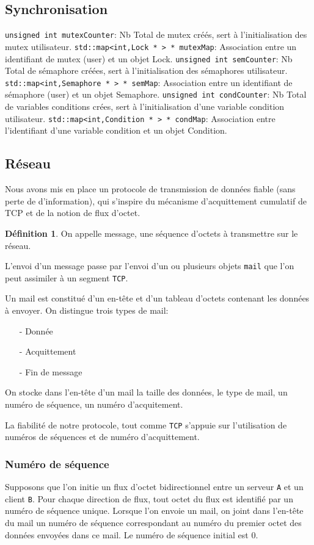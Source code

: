 \documentclass[11pt]{article}
\theoremstyle{definition}
\theoremstyle{definition}
\newtheorem*{myDef}{Définition}
\begin{document}
\subsection{Synchronisation}
\texttt{unsigned int mutexCounter}: Nb Total de mutex créés, sert à l'initialisation des mutex utilisateur.
\texttt{std::map<int,Lock * > * mutexMap}: Association entre un identifiant de mutex (user) et un objet Lock.
\texttt{unsigned int semCounter}: Nb Total de sémaphore créées, sert à l'initialisation des sémaphores utilisateur.
\texttt{std::map<int,Semaphore * > * semMap}: Association entre un identifiant de sémaphore (user) et un objet Semaphore.
\texttt{unsigned int condCounter}: Nb Total de variables conditions crées, sert à l'initialisation d'une variable
condition utilisateur.
\texttt{std::map<int,Condition * > * condMap}: Association entre l'identifiant d'une variable condition et
un objet Condition.

\subsection{Réseau}
Nous avons mis en place un protocole de transmission de données fiable (sans perte de d'information), qui s'inspire du mécanisme d'acquittement cumulatif de TCP et de la notion de flux d'octet.
\begin{myDef}
  On appelle message, une séquence d'octets à transmettre sur le réseau.
\end{myDef}
L'envoi d'un message passe par l'envoi d'un ou plusieurs objets \texttt{mail} que l'on peut assimiler à un segment \texttt{TCP}. 

Un mail est constitué d'un en-tête et d'un tableau d'octets contenant les données à envoyer.
On distingue trois types de mail:
\begin{itemize}
\item[-]Donnée
\item[-]Acquittement
\item[-]Fin de message
\end{itemize}

On stocke dans l'en-tête d'un mail la taille des données, le type de mail, un numéro de séquence, un
numéro d'acquitement.

La fiabilité de notre protocole, tout comme \texttt{TCP} s'appuie sur l'utilisation de numéros de séquences
et de numéro d'acquittement.

\subsubsection{Numéro de séquence}
Supposons que l'on initie un flux d'octet bidirectionnel entre un serveur \texttt{A} et un client \texttt{B}.
Pour chaque direction de flux, tout octet du flux est identifié par un numéro de séquence unique. 
Lorsque l'on envoie un mail, on joint dans l'en-tête du mail un numéro de séquence correspondant
au numéro du premier octet des données envoyées dans ce mail. Le numéro de séquence initial est $0$.
\end{document}
